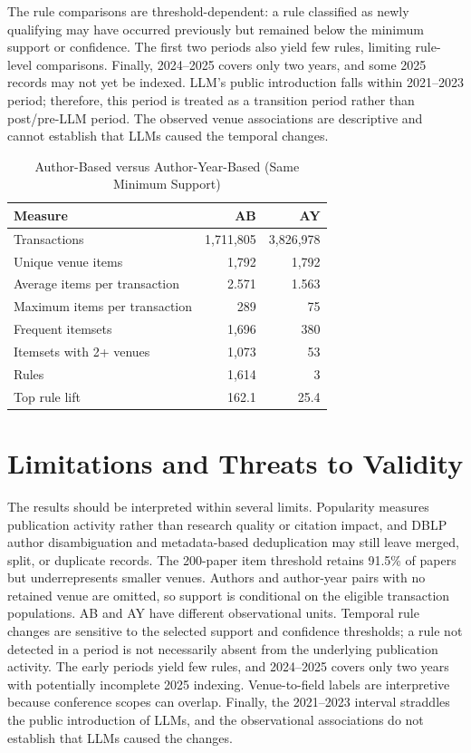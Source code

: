 ﻿\documentclass[conference]{IEEEtran}
\begin{document}
The rule comparisons are threshold-dependent: a rule classified as newly qualifying may have occurred previously but remained below the minimum support or confidence. The first two periods also yield few rules, limiting rule-level comparisons. Finally, 2024--2025 covers only two years, and some 2025 records may not yet be indexed. LLM's public introduction falls within 2021--2023 period; therefore, this period is treated as a transition period rather than post/pre-LLM period. The observed venue associations are descriptive and cannot establish that LLMs caused the temporal changes.

\begin{table}[t]
\caption{Author-Based versus Author-Year-Based (Same Minimum Support)}
\label{tab:abay}
\centering
\footnotesize
\begin{tabular}{lrr}
\toprule
Measure & AB & AY \\
\midrule
Transactions & 1,711,805 & 3,826,978 \\
Unique venue items & 1,792 & 1,792 \\
Average items per transaction & 2.571 & 1.563 \\
Maximum items per transaction & 289 & 75 \\
Frequent itemsets & 1,696 & 380 \\
Itemsets with 2+ venues & 1,073 & 53 \\
Rules & 1,614 & 3 \\
Top rule lift & 162.1 & 25.4 \\
\bottomrule
\end{tabular}
\end{table}

\section{Limitations and Threats to Validity}
The results should be interpreted within several limits. Popularity measures publication activity rather than research quality or citation impact, and DBLP author disambiguation and metadata-based deduplication may still leave merged, split, or duplicate records. The 200-paper item threshold retains 91.5\% of papers but underrepresents smaller venues. Authors and author-year pairs with no retained venue are omitted, so support is conditional on the eligible transaction populations. AB and AY have different observational units. Temporal rule changes are sensitive to the selected support and confidence thresholds; a rule not detected in a period is not necessarily absent from the underlying publication activity. The early periods yield few rules, and 2024--2025 covers only two years with potentially incomplete 2025 indexing. Venue-to-field labels are interpretive because conference scopes can overlap. Finally, the 2021--2023 interval straddles the public introduction of LLMs, and the observational associations do not establish that LLMs caused the changes.
\end{document}
